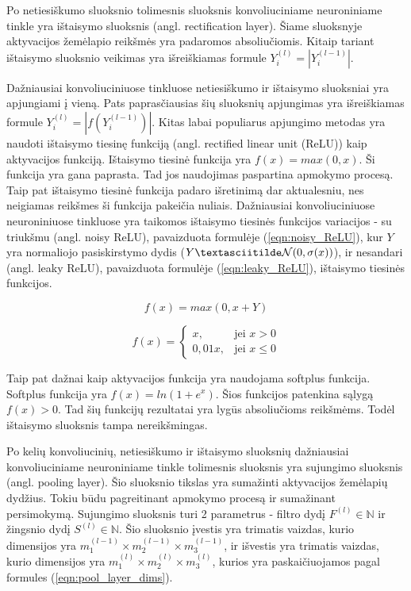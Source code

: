 Po netiesiškumo sluoksnio tolimesnis sluoksnis konvoliuciniame neuroniniame tinkle yra ištaisymo sluoksnis (angl. rectification layer). Šiame sluoksnyje aktyvacijos žemėlapio reikšmės yra padaromos absoliučiomis. Kitaip tariant ištaisymo sluoksnio veikimas yra išreiškiamas formule $Y_i^{(l)} = |Y_i^{(l - 1)}|$.

Dažniausiai konvoliuciniuose tinkluose netiesiškumo ir ištaisymo sluoksniai yra apjungiami į vieną. Pats paprasčiausias šių sluoksnių apjungimas yra išreiškiamas formule $Y_i^{(l)} = |f(Y_i^{(l - 1)})|$. Kitas labai populiarus apjungimo metodas yra naudoti ištaisymo tiesinę funkciją (angl. rectified linear unit (ReLU)) kaip aktyvacijos funkciją. Ištaisymo tiesinė funkcija yra $f(x) = max(0, x)$. Ši funkcija yra gana paprasta. Tad jos naudojimas paspartina apmokymo procesą. Taip pat ištaisymo tiesinė funkcija padaro išretinimą dar aktualesniu, nes neigiamas reikšmes ši funkcija pakeičia nuliais. Dažniausiai konvoliuciniuose neuroniniuose tinkluose yra taikomos ištaisymo tiesinės funkcijos variacijos - su triukšmu (angl. noisy ReLU), pavaizduota formulėje (\ref{eqn:noisy_ReLU}), kur $Y$ yra normaliojo pasiskirstymo dydis ($Y \textasciitilde \mathcal{N}(0, \sigma(x))$), ir nesandari (angl. leaky ReLU), pavaizduota formulėje (\ref{eqn:leaky_ReLU}),  ištaisymo tiesinės funkcijos.

\begin{equation}
\label{eqn:noisy_ReLU}
	f(x) = max(0, x + Y)
\end{equation}

\begin{equation}
\label{eqn:leaky_ReLU}
	f(x) = 
	\begin{cases}
	x, & \mbox{jei } x > 0 \\
	0,01x, & \mbox{jei } x \leq 0
	\end{cases}
\end{equation}

Taip pat dažnai kaip aktyvacijos funkcija yra naudojama softplus funkcija. Softplus funkcija yra $f(x) = ln(1 + e^x)$. Šios funkcijos patenkina sąlygą $f(x) > 0$. Tad šių funkcijų rezultatai yra lygūs absoliučioms reikšmėms. Todėl ištaisymo sluoksnis tampa nereikšmingas.

Po kelių konvoliucinių, netiesiškumo ir ištaisymo sluoksnių dažniausiai konvoliuciniame neuroniniame tinkle tolimesnis sluoksnis yra sujungimo sluoksnis (angl. pooling layer). Šio sluoksnio tikslas yra sumažinti aktyvacijos žemėlapių dydžius. Tokiu būdu pagreitinant apmokymo procesą ir sumažinant persimokymą. Sujungimo sluoksnis turi 2 parametrus - filtro dydį $F^{(l)} \in \mathbb{N}$ ir žingsnio dydį $S^{(l)} \in \mathbb{N}$. Šio sluoksnio įvestis yra trimatis vaizdas, kurio dimensijos yra $m_1^{(l-1)} \times m_2^{(l-1)} \times m_3^{(l-1)}$, ir išvestis yra trimatis vaizdas, kurio dimensijos yra $m_1^{(l)} \times m_2^{(l)} \times m_3^{(l)}$, kurios yra paskaičiuojamos pagal formules (\ref{eqn:pool_layer_dims}).

